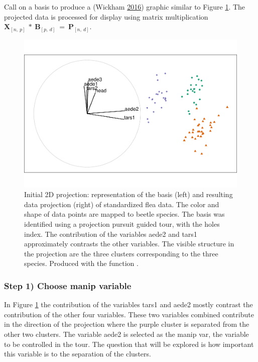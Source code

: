 Call  on a basis to produce a 
(Wickham \protect\hyperlink{ref-wickham_ggplot2:_2016}{2016}) graphic
similar to Figure \ref{fig:step0}. The projected data is processed for
display using matrix multiplication
\(\textbf{X}_{[n,~p]} ~*~ \textbf{B}_{[p,~d]} ~=~ \textbf{P}_{[n,~d]}\).

\begin{Schunk}
\begin{figure}

{\centering \includegraphics[width=0.7\linewidth]{spinifex_paper_files/figure-latex/step0-1} 

}

\caption[Initial 2D projection]{Initial 2D projection: representation of the basis  (left) and resulting data projection (right) of standardized flea data. The color and shape of data points are mapped to beetle species. The basis was identified using a projection pursuit guided tour, with the holes index. The contribution of the variables aede2 and tars1 approximately contrasts the other variables. The visible structure in the projection are the three clusters corresponding to the three species. Produced with the function .}\label{fig:step0}
\end{figure}
\end{Schunk}

\hypertarget{step-1-choose-manip-variable}{%
\subsubsection{Step 1) Choose manip
variable}\label{step-1-choose-manip-variable}}

In Figure \ref{fig:step0} the contribution of the variables tars1 and
aede2 mostly contrast the contribution of the other four variables.
These two variables combined contribute in the direction of the
projection where the purple cluster is separated from the other two
clusters. The variable aede2 is selected as the manip var, the variable
to be controlled in the tour. The question that will be explored is how
important this variable is to the separation of the clusters.

